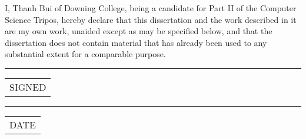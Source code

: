 I, Thanh Bui of Downing College, being a candidate for Part II of the Computer Science Tripos, hereby declare that this dissertation and the work described in it are my own work, unaided except as may be specified below, and that the dissertation does not contain material that has already been used to any substantial extent for a comparable purpose.

\begin{minipage}[t]{0.4\textwidth}
	\vspace*{1.5cm}  %
	\hrule
	\vspace{1mm} %
	\begin{tabular}[t]{l}
		SIGNED
	\end{tabular}
\end{minipage} 
\hspace{2cm}
\begin{minipage}[t]{0.4\textwidth}
	\vspace*{1.5cm}  %
	\hrule
	\vspace{1mm} %
	\begin{tabular}[t]{l}
		DATE
	\end{tabular}
\end{minipage}